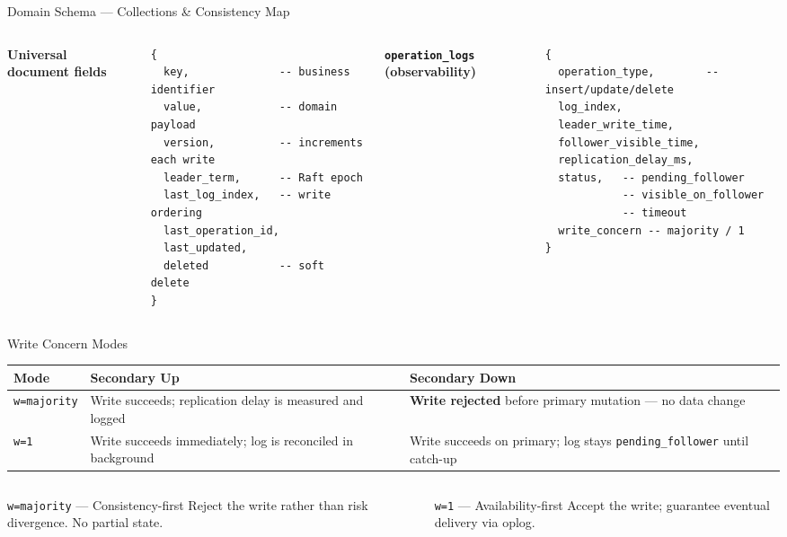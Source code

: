 \documentclass[aspectratio=169]{beamer}
\begin{document}
\begin{frame}[fragile]{Domain Schema --- Collections \& Consistency Map}
\begin{columns}[T]
      \small\textbf{Universal document fields}
      \begin{lstlisting}[language={}]
{
  key,              -- business identifier
  value,            -- domain payload
  version,          -- increments each write
  leader_term,      -- Raft epoch
  last_log_index,   -- write ordering
  last_operation_id,
  last_updated,
  deleted           -- soft delete
}
      \end{lstlisting}
      \vspace{0.1cm}
      \small\textbf{\texttt{operation\_logs} (observability)}
      \begin{lstlisting}[language={}]
{
  operation_type,        -- insert/update/delete
  log_index,
  leader_write_time,
  follower_visible_time,
  replication_delay_ms,
  status,   -- pending_follower
            -- visible_on_follower
            -- timeout
  write_concern -- majority / 1
}
      \end{lstlisting}
  \end{columns}
\end{frame}

\begin{frame}{Write Concern Modes}
  \begin{table}
    \small
    \begin{tabular}{p{}p{}p{}}
      \toprule
      Mode & Secondary \textbf{Up} & Secondary \textbf{Down} \\
      \midrule
      \texttt{w=majority} &
      Write succeeds; replication delay is measured and logged &
      \textbf{Write rejected} before primary mutation --- no data change \\
      \addlinespace
      \texttt{w=1} &
      Write succeeds immediately; log is reconciled in background &
      Write succeeds on primary; log stays \texttt{pending\_follower} until catch-up \\
      \bottomrule
    \end{tabular}
  \end{table}
  \begin{columns}
      \begin{alertblock}{\texttt{w=majority} --- Consistency-first}
        \small Reject the write rather than risk divergence. No partial state.
      \end{alertblock}
      \begin{block}{\texttt{w=1} --- Availability-first}
        \small Accept the write; guarantee eventual delivery via oplog.
      \end{block}
  \end{columns}
\end{frame}
\end{document}
